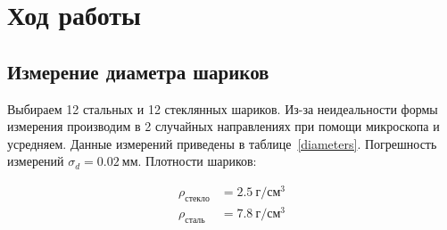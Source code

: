 \documentclass[a4paper, 12pt]{article}
\begin{document}
    \section{Ход работы}
    \subsection{Измерение диаметра шариков}

    Выбираем 12 стальных и 12 стеклянных шариков. Из-за неидеальности формы измерения производим в 2 случайных направлениях при помощи микроскопа и усредняем. Данные измерений приведены в таблице~\ref{diameters}. Погрешность измерений $\sigma_d = 0.02~мм$. Плотности шариков:

    \begin{align*}
        \rho_{стекло}&=2.5~г/см^3\\
        \rho_{сталь}&=7.8~г/см^3
    \end{align*}
\end{document}
